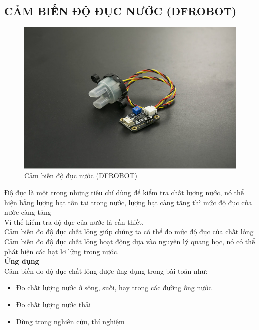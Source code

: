 \subsection{CẢM BIẾN ĐỘ ĐỤC NƯỚC (DFROBOT)}
\begin{figure}[H]
	\centering
	\includegraphics[scale=.3]{Chapter 3/image chapter 3/TurbiSensor.jpg}
	\caption[Cảm biến độ đục nước (DFROBOT)]{Cảm biến độ đục nước (DFROBOT)}
\end{figure}
Độ đục là một trong những tiêu chí dùng để kiểm tra chất lượng nước, nó thể hiện bằng lượng hạt tồn tại trong nước, lượng hạt càng tăng thì mức độ đục của nước càng tăng\\
\indent Vì thế kiểm tra độ đục của nước là cần thiết.\\
\indent Cảm biến đo độ đục chất lỏng giúp chúng ta có thể đo mức độ đục của chất lỏng\\
\indent Cảm biến đo độ đục chất lỏng hoạt động dựa vào nguyên lý quang học, nó có thể phát hiện các hạt lơ lửng trong nước.\\
\indent \textbf{Ứng dụng}\\
\indent Cảm biến đo độ đục chất lỏng được ứng dụng trong bài toán như:
\begin{itemize}
	\item Đo chất lượng nước ở sông, suối, hay trong các đường ống nước
	\item Đo chất lượng nước thải
	\item Dùng trong nghiên cứu, thí nghiệm
\end{itemize}

